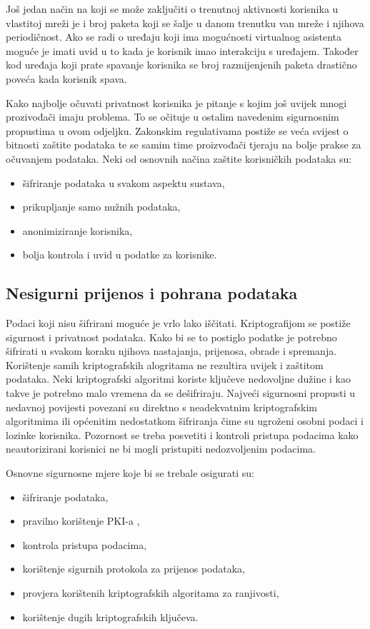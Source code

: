 \documentclass[times, utf8, diplomski]{fer}
\begin{document}
Još jedan način na koji se može zaključiti o trenutnoj aktivnosti korisnika u vlastitoj mreži je i broj paketa koji se šalje u danom trenutku van mreže i njihova periodičnost. Ako se radi o uređaju koji ima mogućnosti virtualnog asistenta moguće je imati uvid u to kada je korisnik imao interakciju s uređajem. Također kod uređaja koji prate spavanje korisnika se broj razmijenjenih paketa drastično poveća kada korisnik spava\citep{Apthorpe2017May}.

Kako najbolje očuvati privatnost korisnika je pitanje s kojim još uvijek mnogi prozivođači imaju problema. To se očituje u ostalim navedenim sigurnosnim propustima u ovom odjeljku. Zakonskim regulativama postiže se veća svijest o bitnosti zaštite podataka te se samim time proizvođači tjeraju na bolje prakse za očuvanjem podataka. Neki od osnovnih načina zaštite korisničkih podataka su: 
\begin{itemize}
    \item šifriranje podataka u svakom aspektu sustava,
    \item prikupljanje samo nužnih podataka,
    \item anonimiziranje korisnika,
    \item bolja kontrola i uvid u podatke za korisnike.
\end{itemize}

\subsection{Nesigurni prijenos i pohrana podataka}
Podaci koji nisu šifrirani moguće je vrlo lako iščitati. Kriptografijom se postiže sigurnost i privatnost podataka. Kako bi se to postiglo podatke je potrebno šifrirati u svakom koraku njihova nastajanja, prijenosa, obrade i spremanja. Korištenje samih kriptografskih alogritama ne rezultira uvijek i zaštitom podataka. Neki kriptografski algoritmi koriste ključeve nedovoljne dužine i kao takve je potrebno malo vremena da se dešifriraju. Najveći sigurnosni propusti u nedavnoj povijesti povezani su direktno s neadekvatnim kriptografskim algoritmima ili općenitim nedostatkom šifriranja čime su ugroženi osobni podaci i lozinke korisnika\citep{DataBreaches}. Pozornost se treba posvetiti i kontroli pristupa podacima kako neautorizirani korisnici ne bi mogli pristupiti nedozvoljenim podacima. 

Osnovne sigurnosne mjere koje bi se trebale osigurati su: \begin{itemize}
    \item šifriranje podataka,
    \item pravilno korištenje PKI-a ,
    \item kontrola pristupa podacima,
    \item korištenje sigurnih protokola za prijenos podataka,
    \item provjera korištenih kriptografskih algoritama za ranjivosti,
    \item korištenje dugih kriptografskih ključeva.
\end{itemize}     
\end{document}
